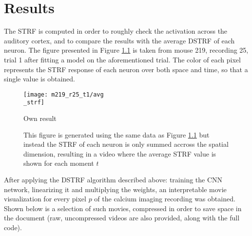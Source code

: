 \chapter{Results}\label{results}

The STRF is computed in order to roughly check the activation across the auditory cortex, and to compare the results with the average DSTRF of each neuron. The figure presented in Figure \ref{fig:strf_m219_r25} is taken from mouse 219, recording 25, trial 1 after fitting a  model on the aforementioned trial. The color of each pixel represents the STRF response of each neuron over both space and time, so that a single value is obtained.

\begin{figure}[ht]
	\centering
	\texttt{[image: m219\_r25\_t1/avg\\\_strf]}
	\caption{Own result}
	\label{fig:strf_m219_r25}
\end{figure}

\begin{figure}
\centering
{}
\caption{This figure is generated using the same data as Figure \ref{fig:strf_m219_r25} but instead the STRF of each neuron is only summed accross the spatial dimension, resulting in a video where the average STRF value is shown for each moment $t$}
\end{figure}




After applying the DSTRF algorithm described above: training the CNN network, linearizing it and multiplying the weights, an interpretable movie visualization for every pixel $p$ of the calcium imaging recording was obtained. Shown below is a selection of such movies, compressed in order to save space in the document (raw, uncompressed videos are also provided, along with the full code).


